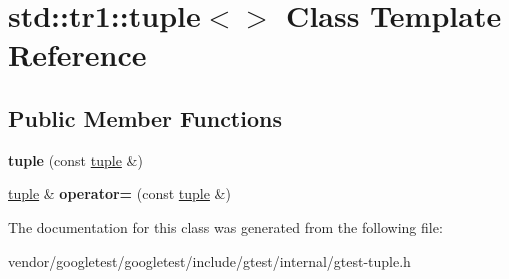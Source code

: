\hypertarget{classstd_1_1tr1_1_1tuple_3_4}{}\section{std\+:\+:tr1\+:\+:tuple$<$$>$ Class Template Reference}
\label{classstd_1_1tr1_1_1tuple_3_4}
\subsection*{Public Member Functions}
\begin{DoxyCompactItemize}
\item 
{\bfseries tuple} (const \hyperlink{classstd_1_1tr1_1_1tuple}{tuple} \&)\hypertarget{classstd_1_1tr1_1_1tuple_3_4_aa857599acb126134e29dc5e53fd9d1a7}{}\label{classstd_1_1tr1_1_1tuple_3_4_aa857599acb126134e29dc5e53fd9d1a7}

\item 
\hyperlink{classstd_1_1tr1_1_1tuple}{tuple} \& {\bfseries operator=} (const \hyperlink{classstd_1_1tr1_1_1tuple}{tuple} \&)\hypertarget{classstd_1_1tr1_1_1tuple_3_4_a93ddab6f662662fc49635608619150c8}{}\label{classstd_1_1tr1_1_1tuple_3_4_a93ddab6f662662fc49635608619150c8}

\end{DoxyCompactItemize}


The documentation for this class was generated from the following file\+:\begin{DoxyCompactItemize}
\item 
vendor/googletest/googletest/include/gtest/internal/gtest-\/tuple.\+h\end{DoxyCompactItemize}

